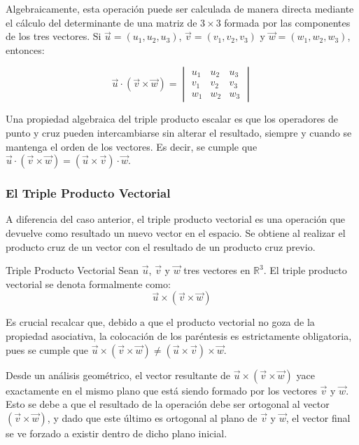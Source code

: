 Algebraicamente, esta operación puede ser calculada de manera directa mediante el cálculo del determinante de una matriz de $3 \times 3$ formada por las componentes de los tres vectores. Si $\vec{u} = (u_1, u_2, u_3)$, $\vec{v} = (v_1, v_2, v_3)$ y $\vec{w} = (w_1, w_2, w_3)$, entonces:

\[ \vec{u} \cdot (\vec{v} \times \vec{w}) = \begin{vmatrix} 
u_1 & u_2 & u_3 \\ 
v_1 & v_2 & v_3 \\ 
w_1 & w_2 & w_3 
\end{vmatrix} \]

Una propiedad algebraica del triple producto escalar es que los operadores de punto y cruz pueden intercambiarse sin alterar el resultado, siempre y cuando se mantenga el orden de los vectores. Es decir, se cumple que $\vec{u} \cdot (\vec{v} \times \vec{w}) = (\vec{u} \times \vec{v}) \cdot \vec{w}$.

\subsubsection{El Triple Producto Vectorial}

A diferencia del caso anterior, el triple producto vectorial es una operación que devuelve como resultado un nuevo vector en el espacio. Se obtiene al realizar el producto cruz de un vector con el resultado de un producto cruz previo.

\begin{mydefinition}{Triple Producto Vectorial}
Sean $\vec{u}$, $\vec{v}$ y $\vec{w}$ tres vectores en $\mathbb{R}^3$. El triple producto vectorial se denota formalmente como:
\[ \vec{u} \times (\vec{v} \times \vec{w}) \]
\end{mydefinition}

Es crucial recalcar que, debido a que el producto vectorial no goza de la propiedad asociativa, la colocación de los paréntesis es estrictamente obligatoria, pues se cumple que $\vec{u} \times (\vec{v} \times \vec{w}) \neq (\vec{u} \times \vec{v}) \times \vec{w}$.

Desde un análisis geométrico, el vector resultante de $\vec{u} \times (\vec{v} \times \vec{w})$ yace exactamente en el mismo plano que está siendo formado por los vectores $\vec{v}$ y $\vec{w}$. Esto se debe a que el resultado de la operación debe ser ortogonal al vector $(\vec{v} \times \vec{w})$, y dado que este último es ortogonal al plano de $\vec{v}$ y $\vec{w}$, el vector final se ve forzado a existir dentro de dicho plano inicial.

